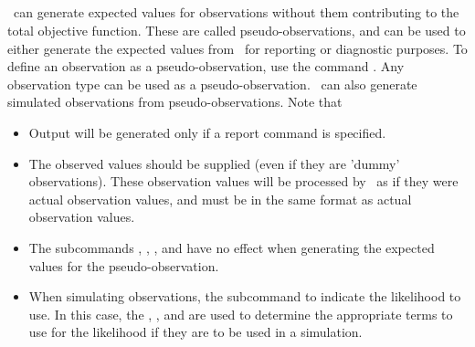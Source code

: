 
\subsection{}\label{sec:PseudoObservations}

\CNAME\ can generate expected values for observations without them contributing to the total objective function. These are called pseudo-observations, and can be used to either generate the expected values from \CNAME\ for reporting or diagnostic purposes. To define an observation as a pseudo-observation, use the command . Any observation type can be used as a pseudo-observation. \CNAME\ can also generate simulated observations from pseudo-observations. Note that

\begin{itemize}
  \item Output will be generated only if a report command  is specified.
  \item The observed values should be supplied (even if they are 'dummy' observations). These observation values will be processed by \CNAME\ as if they were actual observation values, and must be in the same format as actual observation values.
  \item The subcommands , , , and  have no effect when generating the expected values for the pseudo-observation.
  \item When simulating observations, the subcommand  to indicate the likelihood to use. In this case, the , , and  are used to determine the appropriate terms to use for the likelihood if they are to be used in a simulation.
\end{itemize}


\subsection{}\label{sec:Residuals}

